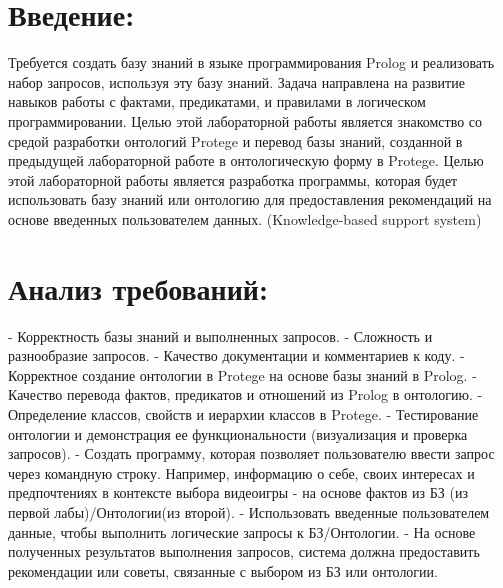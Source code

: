 
\tableofcontents

\newpage


\section{Введение:}
Требуется создать базу знаний в языке программирования Prolog и реализовать набор запросов, используя эту базу знаний. Задача направлена на развитие навыков работы с фактами, предикатами, и правилами в логическом программировании.
Целью этой лабораторной работы является знакомство со средой разработки онтологий Protege и перевод базы знаний, созданной в предыдущей лабораторной работе в онтологическую форму в Protege.
Целью этой лабораторной работы является разработка программы, которая будет использовать базу знаний или онтологию для предоставления рекомендаций на основе введенных пользователем данных. (Knowledge-based support system)


\section{Анализ требований:}
- Корректность базы знаний и выполненных запросов.
- Сложность и разнообразие запросов.
- Качество документации и комментариев к коду.
- Корректное создание онтологии в Protege на основе базы знаний в Prolog.
- Качество перевода фактов, предикатов и отношений из Prolog в онтологию.
- Определение классов, свойств и иерархии классов в Protege.
- Тестирование онтологии и демонстрация ее функциональности (визуализация и проверка запросов).
- Создать программу, которая позволяет пользователю ввести запрос через командную строку. Например, информацию о себе, своих интересах и предпочтениях в контексте выбора видеоигры - на основе фактов из БЗ (из первой лабы)/Онтологии(из второй).
- Использовать введенные пользователем данные, чтобы выполнить логические запросы к БЗ/Онтологии.
- На основе полученных результатов выполнения запросов, система должна предоставить рекомендации или советы, связанные с выбором из БЗ или онтологии.


